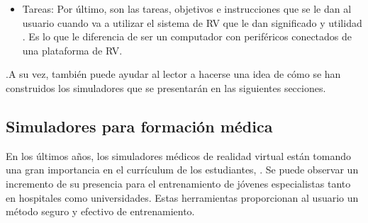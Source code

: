 \begin{itemize}
    \item Tareas: Por último, son las tareas, objetivos e instrucciones que se le dan al usuario cuando va a utilizar el sistema de \ac{RV} que le dan significado y utilidad . Es lo que le diferencia de ser un computador con periféricos conectados de una plataforma de \ac{RV}.
\end{itemize}

.A su vez, también puede ayudar al lector a hacerse una idea de cómo se han construidos los simuladores que se presentarán en las siguientes secciones.

\subsection{Simuladores para formación médica}
\label{art:medicalsim}

En los últimos años, los simuladores médicos de realidad virtual están tomando una gran importancia en el currículum de los estudiantes, \cite{PATEL2017266.e7}. Se puede observar un incremento de su presencia para el entrenamiento de jóvenes especialistas tanto en hospitales como universidades. Estas herramientas proporcionan al usuario un método seguro y efectivo de entrenamiento. 

